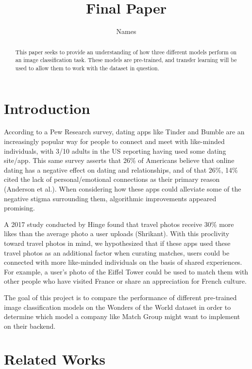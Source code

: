 \documentclass{article}
\title{Final Paper}
\author{Names}
\begin{document}
	
	
\maketitle
	
\begin{abstract}
	This paper seeks to provide an understanding of how three different models perform on an image classification task. These models are pre-trained, and transfer learning will be used to allow them to work with the dataset in question.
\end{abstract}

\section{Introduction}

According to a Pew Research survey, dating apps like Tinder and Bumble are an increasingly popular way for people to connect and meet with like-minded individuals, with 3/10 adults in the US reporting having used some dating site/app. This same survey asserts that 26\% of Americans believe that online dating has a negative effect on dating and relationships, and of that 26\%, 14\% cited the lack of personal/emotional connections as their primary reason (Anderson et al.). When considering how these apps could alleviate some of the negative stigma surrounding them, algorithmic improvements appeared promising. 

A 2017 study conducted by Hinge found that travel photos receive 30\% more likes than the average photo a user uploads (Shrikant). With this proclivity toward travel photos in mind, we hypothesized that if these apps used these travel photos as an additional factor when curating matches, users could be connected with more like-minded individuals on the basis of shared experiences. For example, a user’s photo of the Eiffel Tower could be used to match them with other people who have visited France or share an appreciation for French culture.

The goal of this project is to compare the performance of different pre-trained image classification models on the Wonders of the World dataset in order to determine which model a company like Match Group might want to implement on their backend.


\section{Related Works}
\end{document}
